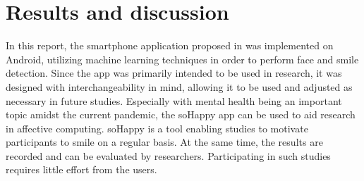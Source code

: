 \section{Results and discussion} \label{sec:results_and_discussion}

In this report, the smartphone application proposed in \cite{sohappy} was 
implemented on Android, utilizing machine learning techniques in order to 
perform face and smile detection.
Since the app was primarily intended to be used in research, it was designed
with interchangeability in mind, allowing it to be used and adjusted as 
necessary in future studies. Especially with mental health being an important
topic amidst the current pandemic, the soHappy app can be used to aid research 
in affective computing.
soHappy is a tool enabling studies to motivate participants to smile on a 
regular basis. At the same time, the results are recorded and can be evaluated 
by researchers. Participating in such studies requires little effort from the 
users.
